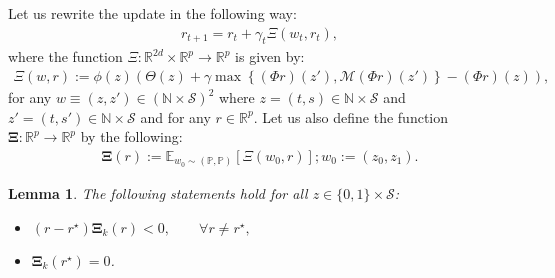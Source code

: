 \documentclass{article}
\newtheorem{lemma}{Lemma}
\begin{document}
Let us rewrite the update in the following way:
\begin{align*}
    r_{t+1}=r_t+\gamma_t\Xi(w_t,r_t),
\end{align*}
where the function $\Xi:\mathbb{R}^{2d}\times \mathbb{R}^p\to\mathbb{R}^p$ is given by:
\begin{align*}
\Xi(w,r):=\phi(z)\left(\Theta(z)+\gamma\max\left\{(\Phi r) (z'),\mathcal{M}(\Phi r) (z')\right\}-(\Phi r)(z)\right),
\end{align*}
for any $w\equiv (z,z')\in\left(\mathbb{N}\times\mathcal{S}\right)^2$ where $z=(t,s)\in\mathbb{N}\times\mathcal{S}$ and $z'=(t,s')\in\mathbb{N}\times\mathcal{S}$  and for any $r\in\mathbb{R}^p$. Let us also define the function $\boldsymbol{\Xi}:\mathbb{R}^p\to\mathbb{R}^p$ by the following:
\begin{align*}
    \boldsymbol{\Xi}(r):=\mathbb{E}_{w_0\sim (\mathbb{P},\mathbb{P})}\left[\Xi(w_0,r)\right]; w_0:=(z_0,z_1).
\end{align*}
\begin{lemma}\label{iteratation_property_lemma}
The following statements hold for all $z\in \{0,1\}\times \mathcal{S}$:
\begin{itemize}
    \item[i)] $
(r-r^\star)\boldsymbol{\Xi}_k(r)<0,\qquad \forall r\neq r^\star,    
$
\item[ii)] $
\boldsymbol{\Xi}_k(r^\star)=0$.
\end{itemize}
\end{lemma}
\end{document}

